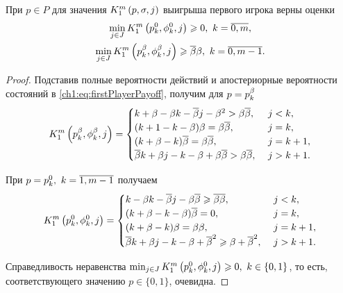 {\begin{proposition}
  \label{ch1:prop:K1-base}
  При $p \in P$ для значения $\firstPlayerPayoff{1}{p}{\sigma}{j}$ выигрыша первого игрока верны оценки
  \begin{equation}
    \label{ch1:eq:lowerBound:inequalities}
    \begin{gathered}
      \min_{j \in J}
      \firstPlayerPayoff{1}{\pEven}{\fEven}{j} \geq 0,\ k = \overline{0, m}, \\
      \min_{j \in J}
      \firstPlayerPayoff{1}{\pOdd}{\fOdd}{j} \geq \DCo\Co,\ k = \overline{0, m-1}.
    \end{gathered}
  \end{equation}
\end{proposition}
\begin{proof}
  Подставив полные вероятности действий и апостериорные вероятности состояний в \eqref{ch1:eq:firstPlayerPayoff}, получим для $p = \pOdd[k]$
  \begin{equation*}
    \firstPlayerPayoff{1}{\pOdd}{\fOdd}{j} = \begin{cases}
      k + \Co - \Co k - \DCo j - \Co^2 > \Co \DCo,\ & j < k,\\
      (k + 1 - k - \Co) \Co = \Co \DCo,\ & j = k,\\
      (k + \Co - k) \DCo = \Co \DCo,\ & j = k+1,\\
      \DCo k + \Co j - k - \Co + \Co \DCo > \Co \DCo,\ & j > k+1.
    \end{cases}
  \end{equation*}
  
  При $p = \pEven,\ k = \overline{1, m-1}$ получаем
  \begin{equation*}
    \firstPlayerPayoff{1}{\pEven}{\fEven}{j} = \begin{cases}
      k - \Co k - \DCo j - \Co \DCo \geq \DCo \DCo,\ & j < k,\\
      (k + \Co - k - \Co) \DCo = 0,\ & j = k,\\
      (k + \Co - k) \Co = \Co \Co,\ & j = k+1,\\
      \DCo k + \Co j - k - \Co + \DCo^2 \geq \Co + \DCo^2,\ & j > k+1.
    \end{cases}
  \end{equation*}

  Справедливость неравенства $\min_{j \in J} \firstPlayerPayoff{1}{\pEven}{\fEven}{j} \geq 0,\ k \in \{0, 1\}$, то есть, соответствующего значению $p \in \{0, 1\}$, очевидна.
\end{proof}

}
